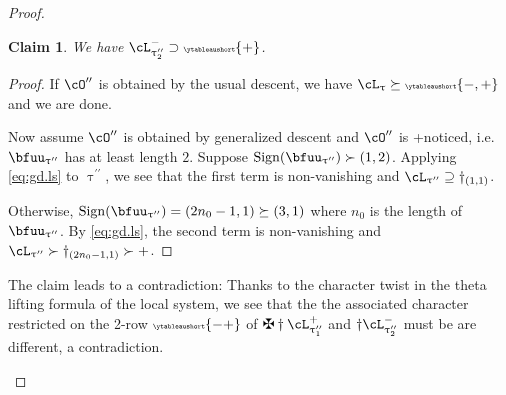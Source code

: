 \documentclass[12pt,a4paper]{amsart}
\numberwithin{equation}{section}
\newtheorem{claim}[thm]{Claim}
\theoremstyle{remark}
\def\ssign{\mathrm{Sign}}
\let\ytb=\ytableaushort
\newcommand{\tytb}[1]{{\tiny\ytb{#1}}}
\def\cOpp{\cO^{\prime\prime}}
\def\pcL{\cL^+}
\def\ncL{\cL^-}
\def\uptaupp{\uptau^{\prime\prime}}
\begin{document}
\begin{proof}
\begin{enumPF}
\begin{enumPF}
    \begin{claim}\label{c:d+}
      We have $\ncL_{\uptaupp_{2}}\supset \tytb{+}$.
    \end{claim}
    \begin{proof}
      If $\cOpp$ is obtained by the usual descent, we have
      $\cL_{\uptau}\succeq \tytb{-,+}$ and we are done.

      Now assume $\cOpp$ is obtained by generalized descent and $\cOpp$ is
      +noticed, i.e. $\bfuu_{\uptaupp}$ has at least length $2$.
      Suppose $\ssign( \bfuu_{\uptaupp} )\succ (1,2)$. Applying \eqref{eq:gd.ls} to $\uptaupp$,
      we see that the first term is non-vanishing and
      $\cL_{\uptaupp}\supseteq \dagger_{(1,1)}$.

      Otherwise, $\ssign( \bfuu_{\uptaupp} ) = (2n_{0}-1,1)\succeq (3,1)$ where $n_{0}$ is the
      length of $\bfuu_{\uptaupp}$. By \eqref{eq:gd.ls}, the second term is
      non-vanishing and $\cL_{\uptaupp}\succ \dagger_{(2n_{0}-1,1)}\succ +$.
    \end{proof}

    The claim leads to a contradiction: Thanks to the character twist in the theta
    lifting formula of the local system, we see that the the associated
    character restricted on the 2-row $\tytb{-+}$ of $\maltese \dagger \pcL_{\uptaupp_{1}}$ and
    $\dagger \ncL_{\uptaupp_{2}}$ must be are different, a contradiction.


\end{enumPF}
\end{enumPF}
\end{proof}
\end{document}

